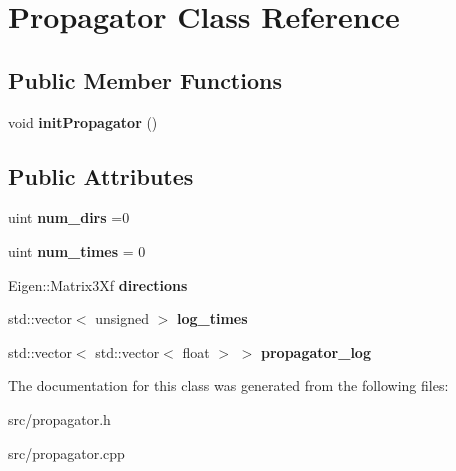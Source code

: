 \hypertarget{class_propagator}{}\section{Propagator Class Reference}
\label{class_propagator}
\subsection*{Public Member Functions}
\begin{DoxyCompactItemize}
\item 
\mbox{\label{class_propagator_aadc489a4d28c7a91e092fb7cef3b7a62}} 
void {\bfseries init\+Propagator} ()
\end{DoxyCompactItemize}
\subsection*{Public Attributes}
\begin{DoxyCompactItemize}
\item 
\mbox{\label{class_propagator_a77f3732528ba16cef0092bc03a9d3020}} 
uint {\bfseries num\+\_\+dirs} =0
\item 
\mbox{\label{class_propagator_ab2e3c09934290a84abd3726faadbadc3}} 
uint {\bfseries num\+\_\+times} = 0
\item 
\mbox{\label{class_propagator_a2adc46036a2a2a8417ccdcd57e0c5f55}} 
Eigen\+::\+Matrix3\+Xf {\bfseries directions}
\item 
\mbox{\label{class_propagator_a9908ca97eaa8011f368510bc8ecc2343}} 
std\+::vector$<$ unsigned $>$ {\bfseries log\+\_\+times}
\item 
\mbox{\label{class_propagator_aac52b49320c34b14b8bb8c5186f16bab}} 
std\+::vector$<$ std\+::vector$<$ float $>$ $>$ {\bfseries propagator\+\_\+log}
\end{DoxyCompactItemize}


The documentation for this class was generated from the following files\+:\begin{DoxyCompactItemize}
\item 
src/propagator.\+h\item 
src/propagator.\+cpp\end{DoxyCompactItemize}
